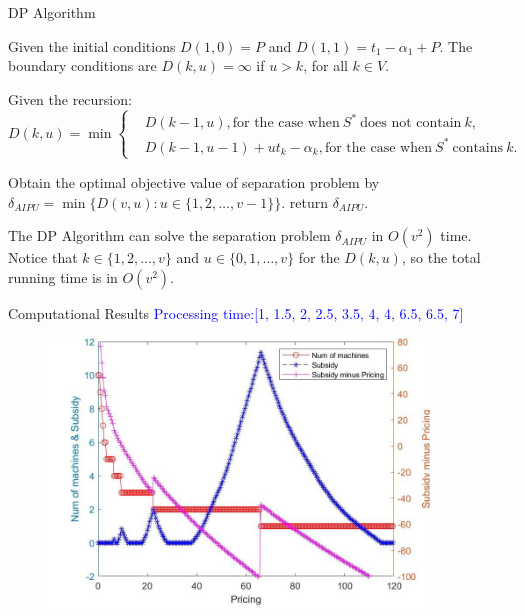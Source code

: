 \documentclass[14pt]{beamer}
\begin{document}
\begin{frame}{DP Algorithm}
	\vspace{-3mm}

	\small
	\begin{description}
	\justifying
	\footnotesize
	\item[Step 2.] Given the initial conditions $D(1,0) = P$ and $D(1,1) = t_1 - \alpha_1 +P$. The boundary conditions are $D(k,u) = \infty$ if $u > k$, for all $k \in V$.
	\item[Step 3.] Given the recursion:
	\begin{equation*}
	D(k,u)= \min \left\{
	\begin{aligned}
	& D(k-1,u), \text{for the case when} \ S^* \ \text{does not contain} \ k, \\
	& D(k-1,u-1) + u t_k - \alpha_k ,\text{for the case when} \ S^* \ \text{contains} \ k.
	\end{aligned}
	\right.
	\end{equation*}

	\item[Step 4.] Obtain the optimal objective value of separation problem by
	$\delta_{AIPU} = \min\{D(v,u): u\in \{1,2,\ldots,v-1\}\}$.
 return $\delta_{AIPU}$.
\end{description}

\begin{block}
	{The DP Algorithm can solve the separation problem $\delta_{AIPU}$ in $O(v^2)$ time.}
	Notice that $k \in \{1,2,\ldots,v\}$ and $u\in \{0,1,\ldots,v\}$ for the $D(k,u)$, so the total running time is in $O(v^2)$.
\end{block}

\end{frame}


\begin{frame}{Computational Results}
	\small
	\centering
	\textcolor{blue}{Processing time:[1, 1.5, 2, 2.5, 3.5, 4, 4, 6.5, 6.5, 7]}
	\vspace{-3mm}
	\begin{figure}[H]
	\centering
	\includegraphics[width=0.9\textwidth]{Figures/Image2}
	\end{figure}
	\centering
\end{frame}
\end{document}
